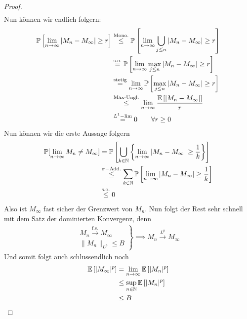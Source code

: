 \documentclass[12pt,a4paper]{article}
\begin{document}
\begin{proof}
\begin{align*}
	\end{align*}
	Nun können wir endlich folgern:
	\begin{align*}
		\mathbb{P}\left[\lim\limits_{n\rightarrow\infty}|M_n-M_\infty| \geq r\right] 
		&\stackrel{\text{Mono.}}{\leq}
		\mathbb{P}\left[\lim\limits_{n\rightarrow\infty}\bigcup\limits_{j\leq n}|M_n-M_\infty| \geq r\right]  \\
		&\stackrel{\text{s.o.}}{=}\mathbb{P}\left[\lim\limits_{n\rightarrow\infty}\max\limits_{j\leq n}|M_n-M_\infty| \geq r\right]  \\
		&\stackrel{\text{stetig}}{=}\lim\limits_{n\rightarrow\infty}\mathbb{P}\left[\max\limits_{j\leq n}|M_n-M_\infty| \geq r\right]  \\
		&\stackrel{\text{Max-Ungl.}}{\leq}\lim\limits_{n\rightarrow\infty}\frac{\mathbb{E}\left[|M_n-M_\infty|\right]}{r}  \\
		&\stackrel{L^1-\lim}{=} 0 \qquad \forall r\geq 0
	\end{align*}
	Nun können wir die erste Aussage folgern
	\begin{align*}
		\mathbb{P}[\lim\limits_{n\rightarrow\infty}M_n \neq M_\infty]
		&=\mathbb{P}\left[\bigcup\limits_{k\in\mathbb{N}}\left\lbrace\lim\limits_{n\rightarrow\infty}|M_n-M_\infty| \geq \frac{1}{k}\right\rbrace\right] \\
		&\stackrel{\sigma-\text{Add.}}{\leq} \sum\limits_{k\in\mathbb{N}}
		\mathbb{P}\left[\lim\limits_{n\rightarrow\infty}|M_n-M_\infty| \geq \frac{1}{k}\right] \\
		&\stackrel{\text{s.o.}}{\leq} 0
	\end{align*}
	Also ist $M_\infty$ fast sicher der Grenzwert von $M_n$. Nun folgt der Rest sehr schnell mit dem Satz der dominierten Konvergenz, denn
	\begin{align*}
		\left.\begin{array}{c}
				M_n \stackrel{\text{f.s.}}{\rightarrow}M_\infty \\
				\|M_n\|_{L^p} \leq B 
			\end{array}\right\rbrace\implies M_n \stackrel{L^p}{\rightarrow}M_\infty
	\end{align*}
	Und somit folgt auch schlussendlich noch
	\begin{align*}
		\mathbb{E}\left[|M_\infty|^p\right] &= 
		\lim\limits_{n\rightarrow\infty}\mathbb{E}\left[|M_n|^p\right]  \\
		&\leq \sup\limits_{n\in\mathbb{N}}\mathbb{E}\left[|M_n|^p\right] \\
		&\leq B
	\end{align*}

\end{proof}
\end{document}
